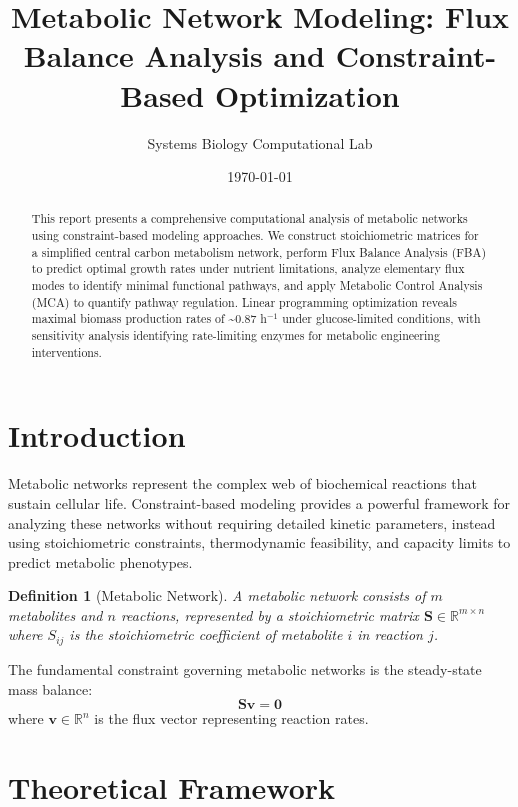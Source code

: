 \documentclass[a4paper, 11pt]{article}
\title{Metabolic Network Modeling: Flux Balance Analysis and Constraint-Based Optimization}
\author{Systems Biology Computational Lab}
\date{\today}
\newtheorem{definition}{Definition}[section]
\begin{document}
\maketitle

\begin{abstract}
This report presents a comprehensive computational analysis of metabolic networks using constraint-based
modeling approaches. We construct stoichiometric matrices for a simplified central carbon metabolism
network, perform Flux Balance Analysis (FBA) to predict optimal growth rates under nutrient limitations,
analyze elementary flux modes to identify minimal functional pathways, and apply Metabolic Control
Analysis (MCA) to quantify pathway regulation. Linear programming optimization reveals maximal biomass
production rates of \textasciitilde0.87 h$^{-1}$ under glucose-limited conditions, with sensitivity
analysis identifying rate-limiting enzymes for metabolic engineering interventions.
\end{abstract}

\section{Introduction}

Metabolic networks represent the complex web of biochemical reactions that sustain cellular life.
Constraint-based modeling provides a powerful framework for analyzing these networks without requiring
detailed kinetic parameters, instead using stoichiometric constraints, thermodynamic feasibility, and
capacity limits to predict metabolic phenotypes.

\begin{definition}[Metabolic Network]
A metabolic network consists of $m$ metabolites and $n$ reactions, represented by a stoichiometric
matrix $\mathbf{S} \in \mathbb{R}^{m \times n}$ where $S_{ij}$ is the stoichiometric coefficient
of metabolite $i$ in reaction $j$.
\end{definition}

The fundamental constraint governing metabolic networks is the steady-state mass balance:
\begin{equation}
\mathbf{S} \mathbf{v} = \mathbf{0}
\end{equation}
where $\mathbf{v} \in \mathbb{R}^n$ is the flux vector representing reaction rates.

\section{Theoretical Framework}
\end{document}
